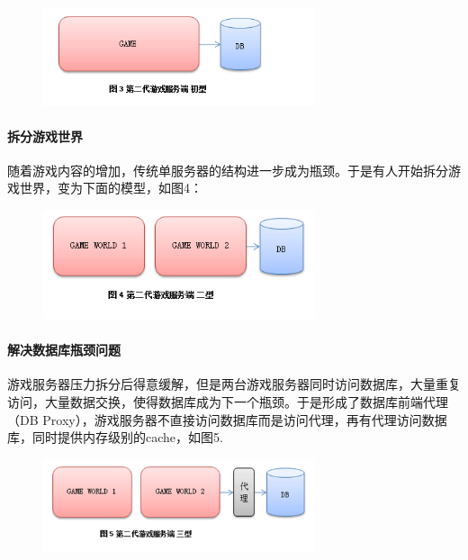 \documentclass[UTF8,a4paper,8pt]{ctexart}
\begin{document}
			\begin{figure}[h] 	
				\centering
				\includegraphics[width=8cm,clip]{gameServer3.png} 	
				\label{fig:gameServer3}
			\end{figure} 
			
			\paragraph{拆分游戏世界}随着游戏内容的增加，传统单服务器的结构进一步成为瓶颈。于是有人开始拆分游戏世界，变为下面的模型，如图4：
			
			\begin{figure}[h] 	
				\centering
				\includegraphics[width=8cm,clip]{gameServer4.png} 	
				\label{fig:gameServer4}
			\end{figure} 
			
			\paragraph{解决数据库瓶颈问题}游戏服务器压力拆分后得意缓解，但是两台游戏服务器同时访问数据库，大量重复访问，大量数据交换，使得数据库成为下一个瓶颈。于是形成了数据库前端代理（DB Proxy），游戏服务器不直接访问数据库而是访问代理，再有代理访问数据库，同时提供内存级别的cache，如图5.
			
			\begin{figure}[h] 	
				\centering
				\includegraphics[width=8cm,clip]{gameServer5.png} 	
				\label{fig:gameServer5}
			\end{figure} 
			
\end{document}
